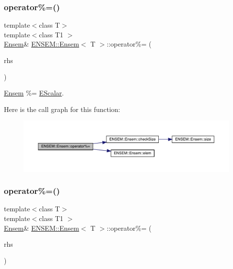 \subsubsection{\texorpdfstring{operator\%=()}{operator\%=()}\hspace{0.1cm}{\footnotesize\ttfamily [2/3]}}
{\footnotesize\ttfamily template$<$class T$>$ \\
template$<$class T1 $>$ \\
\mbox{\hyperlink{classENSEM_1_1Ensem}{Ensem}}\& \mbox{\hyperlink{classENSEM_1_1Ensem}{E\+N\+S\+E\+M\+::\+Ensem}}$<$ T $>$\+::operator\%= (\begin{DoxyParamCaption}\item[{const \mbox{\hyperlink{classENSEM_1_1EScalar}{E\+Scalar}}$<$ T1 $>$ \&}]{rhs }\end{DoxyParamCaption})\hspace{0.3cm}{\ttfamily [inline]}}



\mbox{\hyperlink{classENSEM_1_1Ensem}{Ensem}} \%= \mbox{\hyperlink{classENSEM_1_1EScalar}{E\+Scalar}}. 

Here is the call graph for this function\+:
\nopagebreak
\begin{figure}[H]
\begin{center}
\leavevmode
\includegraphics[width=350pt]{d7/d3e/classENSEM_1_1Ensem_a8f910ad50fa1625b535bd2456aa7ad64_cgraph}
\end{center}
\end{figure}
\mbox{\label{classENSEM_1_1Ensem_a8f910ad50fa1625b535bd2456aa7ad64}} 
\subsubsection{\texorpdfstring{operator\%=()}{operator\%=()}\hspace{0.1cm}{\footnotesize\ttfamily [3/3]}}
{\footnotesize\ttfamily template$<$class T$>$ \\
template$<$class T1 $>$ \\
\mbox{\hyperlink{classENSEM_1_1Ensem}{Ensem}}\& \mbox{\hyperlink{classENSEM_1_1Ensem}{E\+N\+S\+E\+M\+::\+Ensem}}$<$ T $>$\+::operator\%= (\begin{DoxyParamCaption}\item[{const \mbox{\hyperlink{classENSEM_1_1EScalar}{E\+Scalar}}$<$ T1 $>$ \&}]{rhs }\end{DoxyParamCaption})\hspace{0.3cm}{\ttfamily [inline]}}



